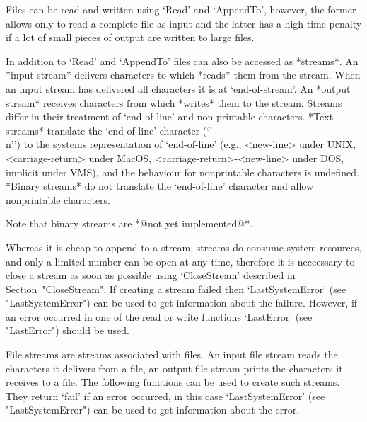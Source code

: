 


Files can be read and  written using `Read'  and `AppendTo', however, the
former allows only to read a complete file as {\GAP} input and the latter
has a high time penalty if a lot of small pieces of output are written to
large files.

In addition  to  `Read'  and `AppendTo'  files  can  also be  accessed as
*streams*.  An *input stream* delivers characters to {\GAP} which *reads*
them from the stream.  When an  input stream has delivered all characters
it is  at `end-of-stream'.  An  *output  stream* receives characters from
{\GAP} which *writes* them   to  the stream.    Streams differ in   their
treatment of `end-of-line' and  non-printable characters.  *Text streams*
translate the `end-of-line'     character (`{'\\n'}')  to  the    systems
representation   of   `end-of-line'   (e.g.,    <new-line>  under   UNIX,
<carriage-return> under  MacOS,  <carriage-return>-<new-line> under  DOS,
implicit under VMS), and  the behaviour  for nonprintable characters   is
undefined.  *Binary streams* do not translate the `end-of-line' character
and allow nonprintable characters.

Note that binary streams are *@not yet implemented@*.

Whereas it is cheap  to append  to a stream,   streams do consume  system
resources, and only  a limited number can  be open at any time, therefore
it   is neccessary  to   close a   stream  as  soon   as possible   using
`CloseStream'  described in Section~"CloseStream".   If creating a stream
failed then `LastSystemError' (see "LastSystemError")  can be used to get
information about the  failure.  However, if an  error occurred in one of
the read or write functions `LastError' (see "LastError") should be used.


File streams  are  streams associated with  files.  An  input file stream
reads  the characters  it delivers from  a  file,  an output  file stream
prints the characters it receives to a file.  The following functions can
be used to create such streams.  They return `fail' if an error occurred,
in this case `LastSystemError' (see "LastSystemError") can be used to get
information about the error.

